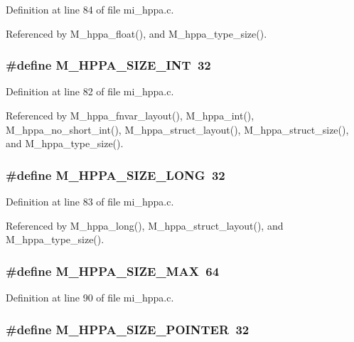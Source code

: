 Definition at line 84 of file mi\_\-hppa.c.

Referenced by M\_\-hppa\_\-float(), and M\_\-hppa\_\-type\_\-size().
\subsubsection{\setlength{\rightskip}{0pt plus 5cm}\#define M\_\-HPPA\_\-SIZE\_\-INT~32}\label{mi__hppa_8c_682ca1628b6c0893bd6c690267b2c8b1}




Definition at line 82 of file mi\_\-hppa.c.

Referenced by M\_\-hppa\_\-fnvar\_\-layout(), M\_\-hppa\_\-int(), M\_\-hppa\_\-no\_\-short\_\-int(), M\_\-hppa\_\-struct\_\-layout(), M\_\-hppa\_\-struct\_\-size(), and M\_\-hppa\_\-type\_\-size().
\subsubsection{\setlength{\rightskip}{0pt plus 5cm}\#define M\_\-HPPA\_\-SIZE\_\-LONG~32}\label{mi__hppa_8c_99c59ea739a1aa32847de07e75b802b3}




Definition at line 83 of file mi\_\-hppa.c.

Referenced by M\_\-hppa\_\-long(), M\_\-hppa\_\-struct\_\-layout(), and M\_\-hppa\_\-type\_\-size().
\subsubsection{\setlength{\rightskip}{0pt plus 5cm}\#define M\_\-HPPA\_\-SIZE\_\-MAX~64}\label{mi__hppa_8c_2cf1c04fdf414169d35d7c06acc50173}




Definition at line 90 of file mi\_\-hppa.c.
\subsubsection{\setlength{\rightskip}{0pt plus 5cm}\#define M\_\-HPPA\_\-SIZE\_\-POINTER~32}\label{mi__hppa_8c_cfc53e68f4296f9cd535d7441400eb33}




